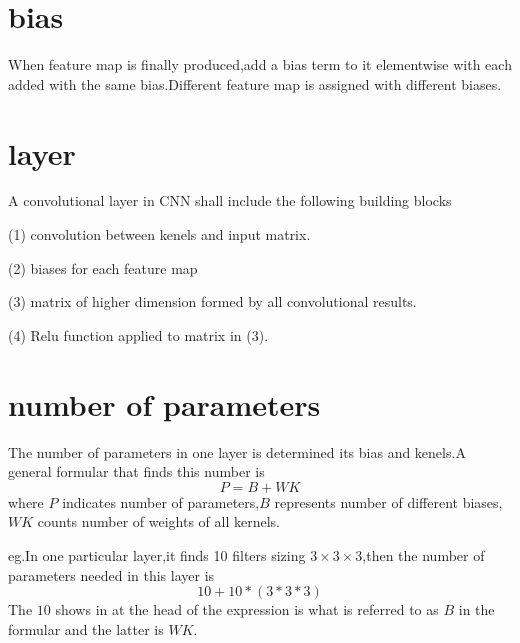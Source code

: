 \documentclass{article}
\begin{document}
\section{bias}
When feature map is finally produced,add a bias term to it elementwise with each added with the same bias.Different feature map is assigned with different biases.
\section{layer}
A convolutional layer in CNN shall include the following building blocks
\par (1) convolution between kenels and input matrix.
\par (2) biases for each feature map
\par (3) matrix of higher dimension formed by all convolutional results.
\par (4) Relu function applied to matrix in (3).
\section{number of parameters}
The number of parameters in one layer is determined its bias and kenels.A general formular that finds this number is
$$P=B+WK$$
where $P$ indicates number of parameters,$B$ represents number of different biases,$WK$ counts number of weights of all kernels.
\par eg.In one particular layer,it finds 10 filters sizing $3\times3\times3$,then the number of parameters needed in this layer is$$10+10*(3*3*3)$$
The $10$ shows in at the head of the expression is what is referred to as $B$ in the formular and the latter is $WK$.
\end{document}
